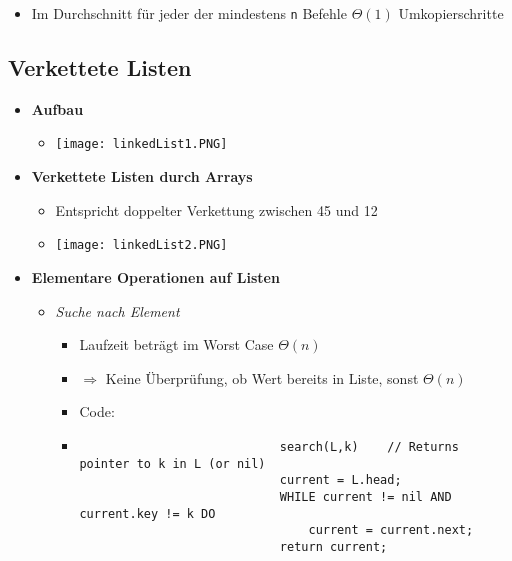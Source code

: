 \begin{itemize}
\begin{itemize}
                \item Im Durchschnitt für jeder der mindestens \texttt{n} Befehle $\Theta(1)$ Umkopierschritte
                
            \end{itemize}
    \end{itemize}

\pagebreak

\subsection{Verkettete Listen}
    \begin{itemize}
        \item \textbf{Aufbau}
            \begin{itemize}
                \item[] \texttt{[image: linkedList1.PNG]}
            \end{itemize}
        
        \item \textbf{Verkettete Listen durch Arrays}
            \begin{itemize}
                \item[] Entspricht doppelter Verkettung zwischen 45 und 12
                \item[] \texttt{[image: linkedList2.PNG]}
            \end{itemize}

        \item \textbf{Elementare Operationen auf Listen}
            \begin{itemize}
                \item \textit{Suche nach Element}
                    \begin{itemize}
                        \item Laufzeit beträgt im Worst Case $\Theta(n)$
                        \item[] $\Rightarrow$ Keine Überprüfung, ob Wert bereits in Liste, sonst $\Theta(n)$
                        \item Code:
                        \item[] 
                            \begin{verbatim}
                            search(L,k)    // Returns pointer to k in L (or nil)
                            current = L.head;
                            WHILE current != nil AND current.key != k DO 
                                current = current.next;
                            return current;
                            \end{verbatim}
                    \end{itemize}


\end{itemize}
\end{itemize}
